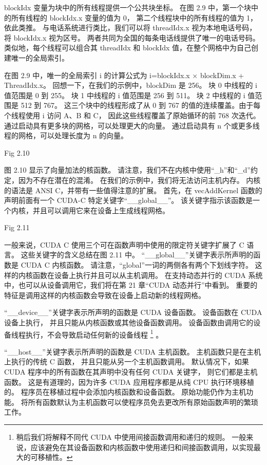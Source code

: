 blockIdx 变量为块中的所有线程提供一个公共块坐标。 在图 2.9 中，第一个块中的所有线程的 blockIdx.x 变量的值为 0，
第二个线程块中的所有线程的值为 1，依此类推。 与电话系统进行类比，我们可以将 threadIdx.x 视为本地电话号码，
将 blockIdx.x 视为区号。 两者共同为全国的每条电话线提供了唯一的电话号码。 
类似地，每个线程可以组合其 threadIdx 和 blockIdx 值，在整个网格中为自己创建唯一的全局索引。

在图 2.9 中，唯一的全局索引 i 的计算公式为 i=blockIdx.x × blockDim.x + ThreadIdx.x。 
回想一下，在我们的示例中，blockDim 是 256。 块 0 中线程的 i 值范围是 0 到 255。 
块 1 中线程的 i 值范围是 256 到 511。 块 2 中线程的 i 值范围是 512 到 767。 
这三个块中的线程形成了从 0 到 767 的值的连续覆盖。由于每个线程使用 i 访问 A、B 和 C，
因此这些线程覆盖了原始循环的前 768 次迭代。 通过启动具有更多块的网格，可以处理更大的向量。 
通过启动具有 n 个或更多线程的网格，可以处理长度为 n 的向量。

{\color{red} Fig 2.10}

图 2.10 显示了向量加法的核函数。 请注意，我们不在内核中使用“\_h”和“\_d”约定，因为不存在潜在的混淆。 
在我们的示例中，我们将无法访问主机内存。 内核的语法是 ANSI C，并带有一些值得注意的扩展。 
首先，在 vecAddKernel 函数的声明前面有一个 CUDA-C 特定关键字“\_\_global\_\_”。 
该关键字指示该函数是一个内核，并且可以调用它来在设备上生成线程网格。

{\color{red} Fig 2.11}

一般来说，CUDA C 使用三个可在函数声明中使用的限定符关键字扩展了 C 语言。 
这些关键字的含义总结在图 2.11 中。 “\_\_global\_\_”关键字表示所声明的函数是 CUDA C 内核函数。 
请注意，“global”一词的两侧各有两个下划线字符。 这样的内核函数在设备上执行并且可以从主机调用。 
在支持动态并行的 CUDA 系统中，也可以从设备调用它，我们将在第 21 章“CUDA 动态并行”中看到。 
重要的特征是调用这样的内核函数会导致在设备上启动新的线程网格。

“\_\_device\_\_”关键字表示所声明的函数是 CUDA 设备函数。 设备函数在 CUDA 设备上执行，
并且只能从内核函数或其他设备函数调用。 设备函数由调用它的设备线程执行，不会导致启动任何新的设备线程
\footnote{稍后我们将解释不同代 CUDA 中使用间接函数调用和递归的规则。 
一般来说，应该避免在其设备函数和内核函数中使用递归和间接函数调用，以实现最大的可移植性。} 。

“\_\_host\_\_”关键字表示所声明的函数是 CUDA 主机函数。 主机函数只是在主机上执行的传统 C 函数，
并且只能从另一个主机函数调用。 默认情况下，如果 CUDA 程序中的所有函数在其声明中没有任何 CUDA 关键字，
则它们都是主机函数。 这是有道理的，因为许多 CUDA 应用程序都是从纯 CPU 执行环境移植的。 
程序员在移植过程中会添加内核函数和设备函数。 原始功能仍作为主机功能。 
将所有函数默认为主机函数可以使程序员免去更改所有原始函数声明的繁琐工作。


